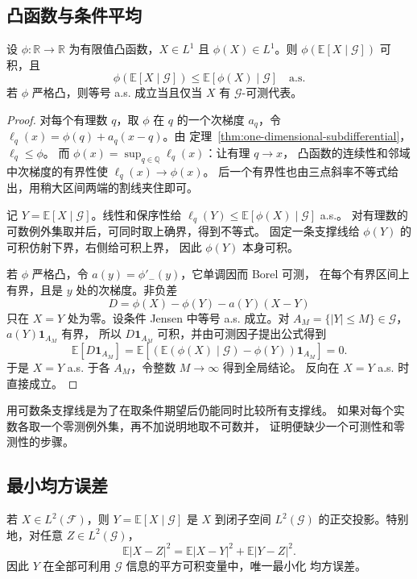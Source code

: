 \subsection{凸函数与条件平均}

\begin{theorem}
\label{thm:conditional-jensen}
设 $\phi:\mathbb R\to\mathbb R$ 为有限值凸函数，$X\in L^1$ 且
$\phi(X)\in L^1$。则 $\phi(\mathbb E[X\mid\mathcal G])$ 可积，且
\[
 \phi(\mathbb E[X\mid\mathcal G])
       \le\mathbb E[\phi(X)\mid\mathcal G]\quad\text{a.s.}
\]
若 $\phi$ 严格凸，则等号 a.s. 成立当且仅当 $X$ 有 $\mathcal G$-可测代表。
\end{theorem}

\begin{proof}
对每个有理数 $q$，取 $\phi$ 在 $q$ 的一个次梯度 $a_q$，令
$\ell_q(x)=\phi(q)+a_q(x-q)$。由
定理~\ref{thm:one-dimensional-subdifferential}，$\ell_q\le\phi$。
而 $\phi(x)=\sup_{q\in\mathbb Q}\ell_q(x)$：让有理 $q\to x$，
凸函数的连续性和邻域中次梯度的有界性使 $\ell_q(x)\to\phi(x)$。
后一个有界性也由三点斜率不等式给出，用稍大区间两端的割线夹住即可。

记 $Y=\mathbb E[X\mid\mathcal G]$。线性和保序性给
$\ell_q(Y)\le\mathbb E[\phi(X)\mid\mathcal G]$ a.s.。
对有理数的可数例外集取并后，可同时取上确界，得到不等式。
固定一条支撑线给 $\phi(Y)$ 的可积仿射下界，右侧给可积上界，
因此 $\phi(Y)$ 本身可积。

若 $\phi$ 严格凸，令 $a(y)=\phi'_-(y)$，它单调因而 Borel 可测，
在每个有界区间上有界，且是 $y$ 处的次梯度。非负差
\[
 D=\phi(X)-\phi(Y)-a(Y)(X-Y)
\]
只在 $X=Y$ 处为零。设条件 Jensen 中等号 a.s. 成立。对
$A_M=\{|Y|\le M\}\in\mathcal G$，$a(Y)\mathbf1_{A_M}$ 有界，
所以 $D\mathbf1_{A_M}$ 可积，并由可测因子提出公式得到
\[
 \mathbb E[D\mathbf1_{A_M}]
 =\mathbb E[(\mathbb E(\phi(X)\mid\mathcal G)-\phi(Y))\mathbf1_{A_M}]=0.
\]
于是 $X=Y$ a.s. 于各 $A_M$，令整数 $M\to\infty$ 得到全局结论。
反向在 $X=Y$ a.s. 时直接成立。
\end{proof}

用可数条支撑线是为了在取条件期望后仍能同时比较所有支撑线。
如果对每个实数各取一个零测例外集，再不加说明地取不可数并，
证明便缺少一个可测性和零测性的步骤。

\subsection{最小均方误差}

\begin{theorem}[条件期望的正交投影表示]
\label{thm:conditional-hilbert-projection}
若 $X\in L^2(\mathcal F)$，则 $Y=\mathbb E[X\mid\mathcal G]$ 是
$X$ 到闭子空间 $L^2(\mathcal G)$ 的正交投影。特别地，对任意
$Z\in L^2(\mathcal G)$，
\begin{equation}
\label{eq:conditional-pythagoras}
 \mathbb E|X-Z|^2=\mathbb E|X-Y|^2+\mathbb E|Y-Z|^2.
\end{equation}
因此 $Y$ 在全部可利用 $\mathcal G$ 信息的平方可积变量中，唯一最小化
均方误差。
\end{theorem}

